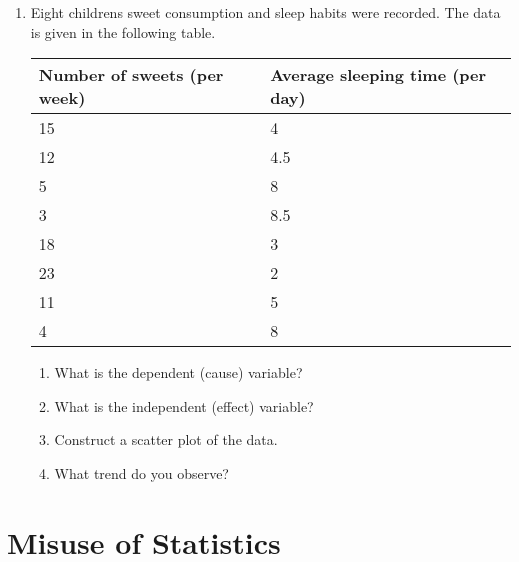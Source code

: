 {\begin{enumerate}
	\begin{enumerate}
	\item Construct a scatter plot and explain how you chose the dependent (cause) and independent (effect) variables.
	\item What pattern or trend do you observe?
	\end{enumerate}
\item Eight childrens sweet consumption and sleep habits were recorded. The data is given in the following table.

\begin{center}
\begin{tabular}{|l|l|}
\hline
Number of sweets (per week) & Average sleeping time (per day) \\ 
\hline
15 & 4   \\
12 & 4.5 \\
5  & 8   \\
3  & 8.5 \\
18 & 3   \\
23 & 2   \\
11 & 5   \\
4  & 8   \\
\hline
\end{tabular}
\end{center}

	\begin{enumerate}
	\item What is the dependent (cause) variable? 
	\item What is the independent (effect) variable?
	\item Construct a scatter plot of the data.
	\item What trend do you observe?
	\end{enumerate}
\end{enumerate}
}

\section{Misuse of Statistics}

